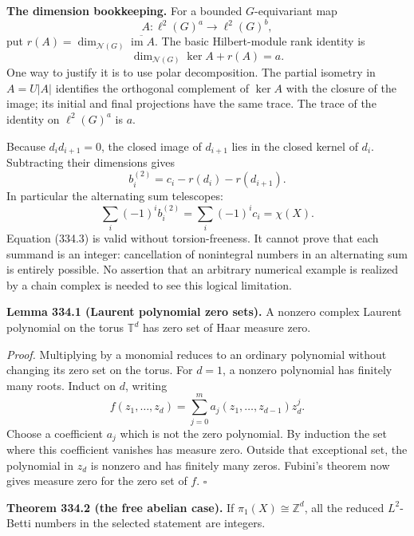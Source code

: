 \documentclass[11pt]{article}
\begin{document}
\textbf{The dimension bookkeeping.} For a bounded $G$-equivariant map
\[
 A:\ell^2(G)^a\longrightarrow\ell^2(G)^b,
\]
put $r(A)=\dim_{\mathcal N(G)}\overline{\operatorname{im}A}$. The basic Hilbert-module rank identity is
\[
 \dim_{\mathcal N(G)}\ker A+r(A)=a.
 \tag{334.1}
\]
One way to justify it is to use polar decomposition. The partial isometry in $A=U|A|$ identifies the orthogonal complement of $\ker A$ with the closure of the image; its initial and final projections have the same trace. The trace of the identity on $\ell^2(G)^a$ is $a$.

Because $d_id_{i+1}=0$, the closed image of $d_{i+1}$ lies in the closed kernel of $d_i$. Subtracting their dimensions gives
\[
 b_i^{(2)}=c_i-r(d_i)-r(d_{i+1}).
 \tag{334.2}
\]
In particular the alternating sum telescopes:
\[
 \sum_i(-1)^i b_i^{(2)}=\sum_i(-1)^i c_i=\chi(X).
 \tag{334.3}
\]
Equation (334.3) is valid without torsion-freeness. It cannot prove that each summand is an integer: cancellation of nonintegral numbers in an alternating sum is entirely possible. No assertion that an arbitrary numerical example is realized by a chain complex is needed to see this logical limitation.

\textbf{Lemma 334.1 (Laurent polynomial zero sets).} A nonzero complex Laurent polynomial on the torus $\mathbb T^d$ has zero set of Haar measure zero.

\emph{Proof.} Multiplying by a monomial reduces to an ordinary polynomial without changing its zero set on the torus. For $d=1$, a nonzero polynomial has finitely many roots. Induct on $d$, writing
\[
 f(z_1,\ldots,z_d)=\sum_{j=0}^m a_j(z_1,\ldots,z_{d-1})z_d^j.
\]
Choose a coefficient $a_j$ which is not the zero polynomial. By induction the set where this coefficient vanishes has measure zero. Outside that exceptional set, the polynomial in $z_d$ is nonzero and has finitely many zeros. Fubini's theorem now gives measure zero for the zero set of $f$. $\square$

\textbf{Theorem 334.2 (the free abelian case).} If $\pi_1(X)\cong\mathbb Z^d$, all the reduced $L^2$-Betti numbers in the selected statement are integers.
\end{document}
